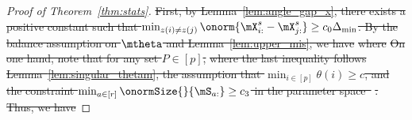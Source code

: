 \documentclass[lettersize,onecolumn,journal]{IEEEtran}
\theoremstyle{definition}
\theoremstyle{definition}
\providecommand{\DIFdeltex}[1]{{\protect\color{red}\sout{#1}}}                      %
\providecommand{\DIFdel}[1]{\texorpdfstring{\DIFdeltex{#1}}{}} %
\begin{document}
\begin{proof}[Proof of Theorem~\ref{thm:stats}]
\DIFdel{First, by Lemma~\ref{lem:angle_gap_x}, there exists a positive constant such that $\min_{z(i) \neq z(j)} \onorm{ \mX^s_{i:} - \mX^s_{j:} } \geq c_0  \Delta_{\min}$. By the balance assumption on $\mtheta$ and Lemma~\ref{lem:upper_mis}, we have 
 }%
\DIFdel{where 
    }%
\DIFdel{On one hand, note that for any set $P \in [p]$,
    }%
\DIFdel{where the last inequality follows Lemma~\ref{lem:singular_thetam}, the assumption that $\min_{i \in [p]} \theta(i) \geq c$, and the constraint $\min_{a \in [r]} \onormSize{}{\mS_{a:}} \geq c_3$ in the parameter space~}%
\DIFdel{. Thus, we have 
    }%


\end{proof}
\end{document}
